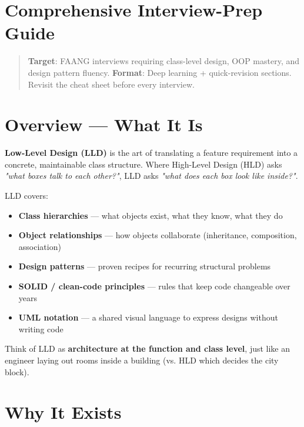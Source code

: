 \documentclass[11pt]{article}
\providecommand{\tightlist}{\setlength{\itemsep}{1pt}\setlength{\parskip}{0pt}}
\begin{document}
\makecoverpage

\thispagestyle{empty}
{\hypersetup{hidelinks}\tableofcontents}
\clearpage

\section{Comprehensive Interview-Prep Guide}\label{comprehensive-interview-prep-guide}

\begin{quote}
\textbf{Target}: FAANG interviews requiring class-level design, OOP mastery, and design pattern fluency.
\textbf{Format}: Deep learning + quick-revision sections. Revisit the cheat sheet before every interview.
\end{quote}

\section{Overview --- What It Is}\label{overview--what-it-is}

\textbf{Low-Level Design (LLD)} is the art of translating a feature requirement into a concrete, maintainable class structure. Where High-Level Design (HLD) asks \emph{"what boxes talk to each other?"}, LLD asks \emph{"what does each box look like inside?"}.

LLD covers:

\begin{itemize}
\tightlist
\item
  \textbf{Class hierarchies} --- what objects exist, what they know, what they do
\item
  \textbf{Object relationships} --- how objects collaborate (inheritance, composition, association)
\item
  \textbf{Design patterns} --- proven recipes for recurring structural problems
\item
  \textbf{SOLID / clean-code principles} --- rules that keep code changeable over years
\item
  \textbf{UML notation} --- a shared visual language to express designs without writing code
\end{itemize}

Think of LLD as \textbf{architecture at the function and class level}, just like an engineer laying out rooms inside a building (vs. HLD which decides the city block).

\section{Why It Exists}\label{why-it-exists}
\end{document}

